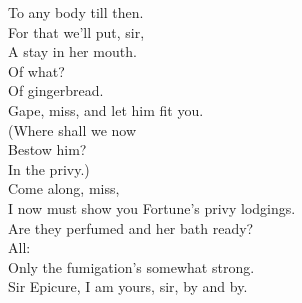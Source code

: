 \documentclass[a4paper,oneside,12pt]{memoir}
\begin{document}
\begin{drama*}
To any body till then.\\
\facespeaks {} For that we'll put, sir,\\
A stay in her mouth.\\
\subtlespeaks {} Of what?\\
\facespeaks {} Of gingerbread.\\
Gape, miss, and let him fit you.\\
\subtlespeaks {} (Where shall we now\\
Bestow him?\\
\dolspeaks {} In the privy.)\\
\subtlespeaks {} Come along, miss,\\
I now must show you Fortune's privy lodgings.\\
\facespeaks Are they perfumed and her bath ready?\\
\subtlespeaks {} All:\\
Only the fumigation's somewhat strong.\\
\facespeaks {}
Sir Epicure, I am yours, sir, by and by.\\

\pagebreak
\scene


\end{drama*}
\end{document}
